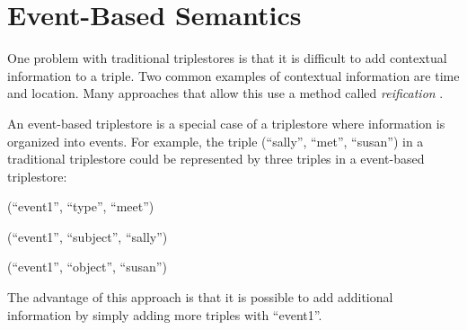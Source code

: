 \documentclass[../main.tex]{subfiles}
\begin{document}
\chapter {Event-Based Semantics}

One problem with traditional triplestores is that it is difficult to add contextual information to a triple.  Two common examples of contextual information are time and location.  Many approaches that allow this use a method called {\em reification} \cite{?}.

An event-based triplestore is a special case of a triplestore where information is organized into events.  For example, the triple (``sally'', ``met'', ``susan'') in a traditional triplestore could be represented by three triples in a event-based triplestore:

(``event1'', ``type'', ``meet'')

(``event1'', ``subject'', ``sally'')

(``event1'', ``object'', ``susan'')

The advantage of this approach is that it is possible to add additional information by simply adding more triples with ``event1''.
\end{document}
